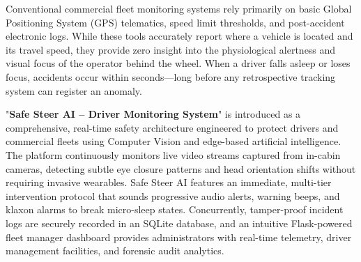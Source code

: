 \documentclass[a4paper,12pt]{report}
\begin{document}
Conventional commercial fleet monitoring systems rely primarily on basic Global Positioning System (GPS) telematics, speed limit thresholds, and post-accident electronic logs. While these tools accurately report where a vehicle is located and its travel speed, they provide zero insight into the physiological alertness and visual focus of the operator behind the wheel. When a driver falls asleep or loses focus, accidents occur within seconds—long before any retrospective tracking system can register an anomaly.

"\textbf{Safe Steer AI -- Driver Monitoring System}" is introduced as a comprehensive, real-time safety architecture engineered to protect drivers and commercial fleets using Computer Vision and edge-based artificial intelligence. The platform continuously monitors live video streams captured from in-cabin cameras, detecting subtle eye closure patterns and head orientation shifts without requiring invasive wearables. Safe Steer AI features an immediate, multi-tier intervention protocol that sounds progressive audio alerts, warning beeps, and klaxon alarms to break micro-sleep states. Concurrently, tamper-proof incident logs are securely recorded in an SQLite database, and an intuitive Flask-powered fleet manager dashboard provides administrators with real-time telemetry, driver management facilities, and forensic audit analytics.
\end{document}

